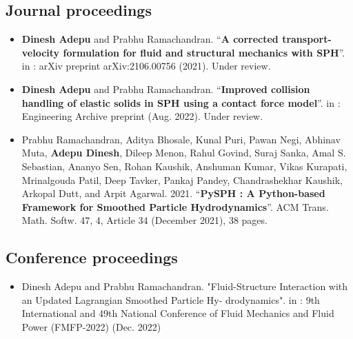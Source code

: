 \listofpublications

\subsection*{Journal proceedings}

\begin{itemize}
\item \textbf{Dinesh Adepu} and Prabhu Ramachandran. ``\textbf{A corrected transport-velocity
  formulation for fluid and structural mechanics with SPH}''. in : arXiv preprint
  arXiv:2106.00756 (2021). Under review.
\item \textbf{Dinesh Adepu} and Prabhu Ramachandran. ``\textbf{Improved collision handling of
  elastic solids in SPH using a contact force model}''. in : Engineering Archive
  preprint (Aug. 2022). Under review.
\item Prabhu Ramachandran, Aditya Bhosale, Kunal Puri, Pawan Negi, Abhinav Muta,
  \textbf{Adepu Dinesh}, Dileep Menon, Rahul Govind, Suraj Sanka, Amal S. Sebastian,
  Ananyo Sen, Rohan Kaushik, Anshuman Kumar, Vikas Kurapati, Mrinalgouda Patil,
  Deep Tavker, Pankaj Pandey, Chandrashekhar Kaushik, Arkopal Dutt, and Arpit
  Agarwal. 2021. ``\textbf{PySPH : A Python-based Framework for Smoothed Particle
  Hydrodynamics}''. ACM Trans. Math. Softw. 47, 4, Article 34 (December 2021), 38
  pages.
\end{itemize}


\subsection*{Conference proceedings}
\label{sec:conf-proc}
\begin{itemize}
\item Dinesh Adepu and Prabhu Ramachandran. "Fluid-Structure Interaction with an
  Updated Lagrangian Smoothed Particle Hy- drodynamics". in : 9th International
  and 49th National Conference of Fluid Mechanics and Fluid Power (FMFP-2022)
  (Dec. 2022)
\end{itemize}





